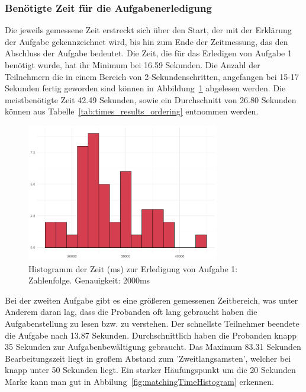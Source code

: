 \subsubsection{Benötigte Zeit für die Aufgabenerledigung}

Die jeweils gemessene Zeit erstreckt sich über den Start, der mit der Erklärung der Aufgabe gekennzeichnet wird, bis hin zum Ende der Zeitmessung, das den Abschluss der Aufgabe bedeutet.
Die Zeit, die für das Erledigen von Aufgabe 1 benötigt wurde, hat ihr Minimum bei 16.59 Sekunden. Die Anzahl der Teilnehmern die in einem Bereich von 2-Sekundenschritten, angefangen bei 15-17 Sekunden fertig geworden sind können in Abbildung~\ref{fig:orderingTimeHistogram} abgelesen werden. Die meistbenötigte Zeit 42.49 Sekunden, sowie ein Durchschnitt von 26.80 Sekunden können aus Tabelle~\ref{tab:times_results_ordering} entnommen werden.

\begin{figure}[H]
	\centering
	\includegraphics[width=0.75\textwidth]{./_StudyResults/orderingTimeHist}
	\caption{Histogramm der Zeit (ms) zur Erledigung von Aufgabe 1: Zahlenfolge. Genauigkeit: 2000ms}
	\label{fig:orderingTimeHistogram}
\end{figure}

Bei der zweiten Aufgabe gibt es eine größeren gemessenen Zeitbereich, was unter Anderem daran lag, dass die Probanden oft lang gebraucht haben die Aufgabenstellung zu lesen bzw. zu verstehen. Der schnellste Teilnehmer beendete die Aufgabe nach 13.87 Sekunden. Durchschnittlich haben die Probanden knapp 35 Sekunden zur Aufgabenbewältigung gebraucht. Das Maximum 83.31 Sekunden Bearbeitungszeit liegt in großem Abstand zum 'Zweitlangsamsten', welcher bei knapp unter 50 Sekunden liegt. Ein starker Häufungspunkt um die 20 Sekunden Marke kann man gut in Abbilung~\ref{fig:matchingTimeHistogram} erkennen.

